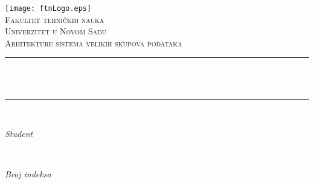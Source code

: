 \begin{titlepage}
	\centering
    \vspace*{0.5 cm}
    \texttt{[image: ftnLogo.eps]}\\[1.0 cm]
    \textsc{\huge Fakultet tehničkih nauka}\\[0.5 cm]	                    %
	\textsc{\LARGE Univerzitet u Novom Sadu}\\[1.0 cm]				        %
        \textsc{\Large Arhitekture sistema velikih skupova podataka}\\[0.5 cm]%
        \vspace{\fill}
	\rule{\linewidth}{0.2 mm} \\[0.4 cm]
	{ \huge \bfseries \thetitle}\\
	\rule{\linewidth}{0.2 mm} \\[1.5 cm]
	\begin{minipage}{0.4\textwidth}
		\begin{flushleft} \large
			\emph{Student}\\
			\theauthor
			\end{flushleft}
			\end{minipage}~
			\begin{minipage}{0.4\textwidth}
			\begin{flushright} \large
			\emph{Broj indeksa} \\
			\theindex								                        %
		\end{flushright}
	\end{minipage}\\[2.0 cm]
	
	{\large \thedate}\\[2 cm]
        \vfill
\end{titlepage}